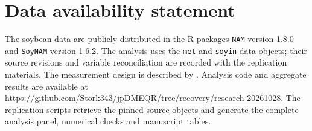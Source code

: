 \section*{Data availability statement}
The soybean data are publicly distributed in the R packages
\texttt{NAM} version 1.8.0 and \texttt{SoyNAM} version 1.6.2.
The analysis uses the \texttt{met} and \texttt{soyin} data objects;
their source revisions and variable reconciliation are recorded with
the replication materials. The measurement design is described by
. Analysis code and aggregate results are
available at \url{https://github.com/Stork343/jpDMEQR/tree/recovery/research-20261028}.
The replication scripts retrieve the pinned source objects and generate
the complete analysis panel, numerical checks and manuscript tables.

